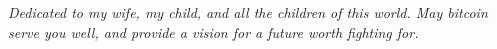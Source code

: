 
\newpage \vspace*{8cm}
\thispagestyle{empty}
\begin{center}
  \Large \emph{
  Dedicated to my wife, my child, and all the children of this world. May
  bitcoin serve you well, and provide a vision for a future worth fighting for.
  }
\end{center}
